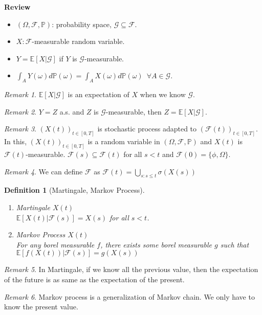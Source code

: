 \documentclass[12pt]{report}
\renewcommand{\P}{\mathbb{P}}
\newcommand{\F}{\mathcal{F}}
\newcommand{\G}{\mathcal{G}}
\newcommand{\E}{\mathbb{E}}
\renewcommand{\1}{\mathbb{1}}
\renewcommand{\O}{\Omega}
\renewcommand{\subset}{\subseteq}
\theoremstyle{break}
\theoremstyle{newdef}
\newtheorem{defn}[thm]{Definition} %
\theoremstyle{remark}
\newtheorem*{rem}{Remark} %
\begin{document}
\textbf{Review}
\begin{itemize}
\item $(\O,\F,\P)$: probability space, $\G \subset \F$.
\item $X : \F$-measurable random variable.
\item $Y = \E[X | \G]$ if $Y$ is $\G$-measurable.
\item $\int_A Y(\omega) d\P(\omega) = \int_A X(\omega) d\P(\omega) \enspace \forall A \in \G$.
\end{itemize}
\begin{rem}
$\E[X|\G]$ is an expectation of $X$ when we know $\G$.
\end{rem}

\begin{rem}
$Y = Z$ a.s. and $Z$ is $\G$-measurable, then $Z = \E[X|\G]$.
\end{rem}



\begin{rem}
$(X(t))_{t\in[0,T]}$ is stochastic process adapted to $(\F(t))_{t\in[0,T]}$.
In this, $(X(t))_{t\in[0,T]}$ is a random variable in $(\O,\F,\P)$ and $X(t)$ is $\F(t)$-measurable.
$\F(s) \subset \F(t)$ for all $s < t$ and $\F(0) = \{\phi,\O\}$.
\end{rem}

\begin{rem}
We can define $\F$ as $\F(t) = \bigcup_{s : s\leq t} \sigma(X(s))$
\end{rem}

\begin{defn}[Martingale, Markov Process]
\leavevmode
\begin{enumerate}
\item Martingale $X(t)$\\
$\E[X(t)|\F(s)] = X(s)$ for all $s < t$.

\item Markov Process $X(t)$\\
For any borel measurable $f$, there exists some borel measurable $g$ such that $\E[f(X(t)) | \F(s)] = g(X(s))$

\end{enumerate}
\end{defn}


\begin{rem}
In Martingale, if we know all the previous value, then the expectation of the future is as same as the expectation of the present.
\end{rem}

\begin{rem}
Markov process is a generalization of Markov chain.
We only have to know the present value.
\end{rem}
\end{document}
